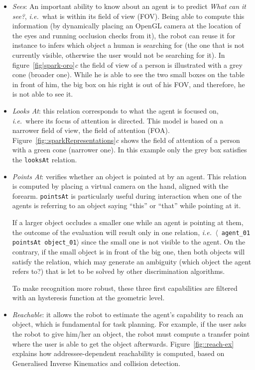 \documentclass[preprint,3p,times]{elsarticle}
\newcommand{\concept}[1]{{\small \texttt{#1}}}
\newcommand{\stmt}[1]{{\footnotesize \tt $\langle$ #1\relax$\rangle$}}
\newcommand{\ie}{{\textit{i.e.\ }}}
\begin{document}
\begin{itemize}

\item \emph{Sees}: An important ability to know about an agent is to predict
    \emph{What can it see?}, \ie what is within its field of view (FOV). Being
    able to compute this information (by dynamically placing an OpenGL camera at
    the location of the eyes and running occlusion checks from it), the robot
    can reuse it for instance to infers which object a human is searching for
    (the one that is not currently visible, otherwise the user would not be
    searching for it).  In figure~\ref{fig|spark-oro}\emph{c} the field of view
    of a person is illustrated with a grey cone (broader one). While he is able
    to see the two small boxes on the table in front of him, the big box on his
    right is out of his FOV, and therefore, he is not able to see it. 

\item \emph{Looks At}: this relation corresponds to what the agent is focused
    on, \ie where its focus of attention is directed. This model is based on a
    narrower field of view, the field of attention (FOA).
    Figure~\ref{fig::sparkRepresentations}\emph{c} shows the field of attention
    of a person with a green cone (narrower one). In this example only the grey
    box satisfies the \concept{looksAt} relation.

\item \emph{Points At}: verifies whether an object is pointed at by an agent.
    This relation is computed by placing a virtual camera on the hand, aligned
    with the forearm. \concept{pointsAt} is particularly useful during
    interaction when one of the agents is referring to an object saying ``this''
    or ``that'' while pointing at it.
 
If a larger object occludes a smaller one while an agent is pointing at them, the
outcome of the evaluation will result only in one relation, \ie \stmt{agent\_01
pointsAt object\_01} since the small one is not visible to the agent.  On the
contrary, if the small object is in front of the big one, then both objects
will satisfy the relation, which may generate an ambiguity (which object the
agent refers to?) that is let to be solved by other discrimination algorithms.

To make recognition more robust, these three first capabilities are filtered
with an hysteresis function at the geometric level.

\item \emph{Reachable}: it allows the robot to estimate the agent's capability
to reach an object, which is fundamental for task planning. For example, if the
user asks the robot to give him/her an object, the robot must compute a transfer
point where the user is able to get the object afterwards. 
Figure~\ref{fig::reach-ex} explains how addressee-dependent reachability is
computed, based on Generalised Inverse Kinematics and collision detection.

\end{itemize}
\end{document}
